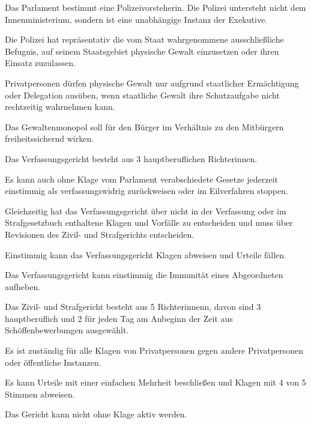 \documentclass{sasbase}
\begin{document}
\begin{article}
	\item Das Parlament bestimmt eine Polizeivorsteherin. Die Polizei untersteht nicht dem Innenministerium, sondern ist eine unabhängige Instanz der Exekutive.
	\item Die Polizei hat repräsentativ die vom Staat wahrgenommene ausschließliche Befugnis, auf seinem Staatsgebiet physische Gewalt einzusetzen oder ihren Einsatz zuzulassen.	\item Privatpersonen dürfen physische Gewalt nur aufgrund staatlicher Ermächtigung oder Delegation ausüben, wenn staatliche Gewalt ihre Schutzaufgabe nicht rechtzeitig wahrnehmen kann.
	\item Das Gewaltenmonopol soll für den Bürger im Verhältnis zu den Mitbürgern freiheitssichernd wirken.
\end{article}


\begin{article}[Verfassungsgericht]
	\item Das Verfassungsgericht besteht aus 3 hauptberuflichen Richterinnen.
	\item Es kann auch ohne Klage vom Parlament verabschiedete Gesetze jederzeit einstimmig als verfassungswidrig zurückweisen oder im Eilverfahren stoppen.
	\item Gleichzeitig hat das Verfassungsgericht über nicht in der Verfassung oder im Strafgesetzbuch enthaltene Klagen und Vorfälle zu entscheiden und muss über Revisionen des Zivil- und Strafgerichts entscheiden.
	\item Einstimmig kann das Verfassungsgericht Klagen abweisen und Urteile fällen.
	\item Das Verfassungsgericht kann einstimmig die Immunität eines Abgeordneten aufheben.
\end{article}

\begin{article}
	\item Das Zivil- und Strafgericht besteht aus 5 Richterinnenn, davon sind 3 hauptberuflich und 2 für jeden Tag am Anbeginn der Zeit aus Schöffenbewerbungen ausgewählt.
	\item Es ist zuständig für alle Klagen von Privatpersonen gegen andere Privatpersonen oder öffentliche Instanzen.
	\item Es kann Urteile mit einer einfachen Mehrheit beschließen und Klagen mit 4 von 5 Stimmen abweisen.
	\item Das Gericht kann nicht ohne Klage aktiv werden.
\end{article}
\end{document}
